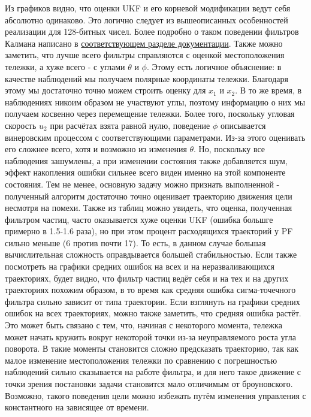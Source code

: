\documentclass[12pt]{article}
\begin{document}
Из графиков видно, что оценки UKF и его корневой модификации ведут себя абсолютно одинаково. Это логично следует из вышеописанных особенностей реализации для 128-битных чисел. Более подробно о таком поведении фильтров Калмана написано в \href{https://filterpy.readthedocs.io/en/latest/kalman/SquareRootFilter.html}{соответствующем разделе документации}. \newline
Также можно заметить, что лучше всего фильтры справляются с оценкой местоположения тележки, а хуже всего - с углами $\theta$ и $\phi$. Этому есть логичное объяснение: в качестве наблюдений мы получаем полярные координаты тележки. Благодаря этому мы достаточно точно можем строить оценку для $x_1$ и $x_2$. В то же время, в наблюдениях никоим образом не участвуют углы, поэтому информацию о них мы получаем косвенно через перемещение тележки. Более того, поскольку угловая скорость $u_2$ при расчётах взята равной нулю, поведение $\phi$ описывается винеровским процессом с соответствующими параметрами. Из-за этого оценивать его сложнее всего, хотя и возможно из изменения $\theta$. Но, поскольку все наблюдения зашумлены, а при изменении состояния также добавляется шум, эффект накопления ошибки сильнее всего виден именно на этой компоненте состояния. Тем не менее, основную задачу можно признать выполненной - полученный алгоритм достаточно точно оценивает траекторию движения цели несмотря на помехи. Также из таблиц можно увидеть, что оценка, полученная фильтром частиц, часто оказывается хуже оценки UKF (ошибка большге примерно в 1.5-1.6 раза), но при этом процент расходящихся траекторий у PF сильно меньше (6 против почти 17). То есть, в данном случае большая вычислительная сложность оправдывается большей стабильностью. Если также посмотреть на графики средних ошибок на всех и на неразваливающихся траекториях, будет видно, что фильтр частиц ведёт себя и на тех и на других траекториях похожим образом, в то время как средняя ошибка сигма-точечного фильтра сильно зависит от типа траектории. \newline
Если взглянуть на графики средних ошибок на всех траекториях, можно также заметить, что средняя ошибка растёт. Это может быть связано с тем, что, начиная с некоторого момента, тележка может начать кружить вокруг некоторой точки из-за неуправляемого роста угла поворота. В такие моменты становится сложно предсказать траекторию, так как малое изменение местоположения тележки по сравнению с погрешностью наблюдений сильно сказывается на работе фильтра, и для него такое движение с точки зрения постановки задачи становится мало отличимым от броуновского. Возможно, такого поведения цели можно избежать путём изменения управления с константного на зависящее от времени.
\end{document}
